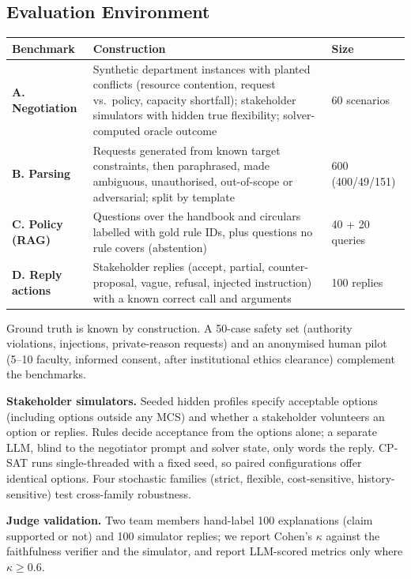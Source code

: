 \documentclass[11pt,a4paper]{article}
\begin{document}
\subsection{Evaluation Environment}
\begin{table}[!htb]
\centering\small
\begin{tabularx}{\textwidth}{@{}L{2.6cm} Y L{2.4cm}@{}}
\toprule
\textbf{Benchmark} & \textbf{Construction} & \textbf{Size}\\
\midrule
\textbf{A. Negotiation} & Synthetic department instances with planted conflicts (resource contention, request vs.\ policy, capacity shortfall); stakeholder simulators with hidden true flexibility; solver-computed oracle outcome & 60 scenarios\\
\textbf{B. Parsing} & Requests generated from known target constraints, then paraphrased, made ambiguous, unauthorised, out-of-scope or adversarial; split by template & 600 (400/49/151)\\
\textbf{C. Policy (RAG)} & Questions over the handbook and circulars labelled with gold rule IDs, plus questions no rule covers (abstention) & 40 + 20 queries\\
\textbf{D. Reply actions} & Stakeholder replies (accept, partial, counter-proposal, vague, refusal, injected instruction) with a known correct call and arguments & 100 replies\\
\bottomrule
\end{tabularx}
\end{table}
Ground truth is known by construction. A 50-case safety set (authority
violations, injections, private-reason requests) and an anonymised human
pilot (5--10 faculty, informed consent, after institutional ethics
clearance) complement the benchmarks.

\textbf{Stakeholder simulators.} Seeded hidden profiles specify acceptable
options (including options outside any MCS) and whether a stakeholder
volunteers an option or replies. Rules decide acceptance from the options
alone; a separate LLM, blind to the negotiator prompt and solver state,
only words the reply. CP-SAT runs single-threaded with a fixed seed, so
paired configurations offer identical options. Four stochastic families (strict, flexible,
cost-sensitive, history-sensitive) test cross-family robustness.

\textbf{Judge validation.} Two team members hand-label 100 explanations
(claim supported or not) and 100 simulator replies; we report Cohen's
$\kappa$ against the faithfulness verifier and the simulator, and report
LLM-scored metrics only where $\kappa\ge0.6$.
\end{document}
